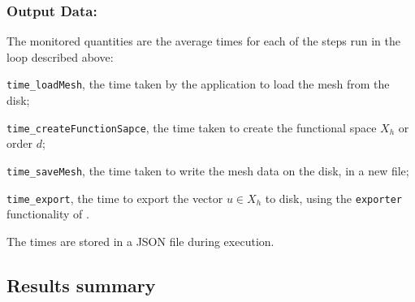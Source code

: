 \subsubsection{Output Data:}

The monitored quantities are the average times for each of the steps run in the loop described above:
\begin{inparaenum}[\it(i)]
\item \texttt{time\_loadMesh}, the time taken by the application to load the mesh from the disk;
\item \texttt{time\_createFunctionSapce}, the time taken to create the functional space $X_h$ or order $d$;
\item \texttt{time\_saveMesh}, the time taken to write the mesh data on the disk, in a new file;
\item \texttt{time\_export}, the time to export the vector $u\in X_h$ to disk, using the \texttt{exporter} functionality of \Feelpp.
\end{inparaenum}
The times are stored in a JSON file during execution.



\subsection{Results summary}


\newcommand{\plot}[3][(0.99,0.99)]{
  \begin{tikzpicture}
    \begin{axis}[
      xlabel={ Number of tasks }, ylabel={ Time [s] },
      xtick=data, xtick align=outside,
      ymode=log,
      ymajorgrids=true, yminorgrids=true,
      xmajorgrids=true,
      xticklabels from table={#2}{#3},
      cycle list name=color list, legend style={at={#1},anchor=north east}
    ]
      \addplot+[mark=*, color=customdarkblue] table [x expr=\coordindex, y=M2] {#2} ;
      \addlegendentry{ \texttt{M2} }
      \addplot+[mark=*, color=customcyan] table [x expr=\coordindex, y=M3] {#2} ;
      \addlegendentry{ \texttt{M3} }
      \addplot+[mark=*, color=customorange] table [x expr=\coordindex, y=M4] {#2} ;
      \addlegendentry{ \texttt{M4} }
      \addplot+[mark=*, color=custompurple] table [x expr=\coordindex, y=M5] {#2} ;
      \addlegendentry{ \texttt{M5} }
    \end{axis}
  \end{tikzpicture}
  \vspace{-2em}
}

